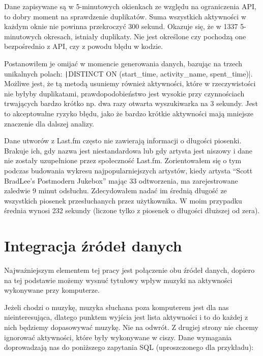 \documentclass[openright]{xmgr}
\begin{document}
        Dane zapisywane są w 5-minutowych okienkach ze względu na ograniczenia API, to dobry moment na sprawdzenie duplikatów.
        Suma wszystkich aktywności w każdym oknie nie powinna przekroczyć 300 sekund.
        Okazuje się, że w 1337 5-minutowych okresach, istniały duplikaty.
        Nie jest określone czy pochodzą one bezpośrednio z API, czy z powodu błędu w kodzie.

        Postanowiłem je omijać w momencie generowania danych, bazując na trzech unikalnych polach:
        \texttt|DISTINCT ON (start_time, activity_name, spent_time)|.
        Możliwe jest, że tą metodą usuniemy również aktywności, które w rzeczywistości nie byłyby duplikatami,
        prawdopodobieństwo jest wysokie przy czynnościach trwających bardzo krótko np. dwa razy otwarta wyszukiwarka na 3 sekundy.
        Jest to akceptowalne ryzyko błędu, jako że bardzo krótkie aktywności mają mniejsze znaczenie dla dalszej analizy.

        Dane utworów z Last.fm często nie zawierają informacji o długości piosenki.
        Brakuje ich, gdy nazwa jest niestandardowa lub gdy artysta jest niszowy i dane nie zostały uzupełnione przez społeczność Last.fm.
        Zorientowałem się o tym podczas budowania wykresu najpopularniejszych artystów,
        kiedy artysta ``Scott BradLee's Postmodern Jukebox'' mając 33 odtworzenia, ma zarejestrowane zaledwie 9 minut odsłuchu.
        Zdecydowałem nadać im średnią długość ze wszystkich piosenek przesłuchanych przez użytkownika.
        W moim przypadku średnia wynosi 232 sekundy (liczone tylko z piosenek o długości dłuższej od zera).

    \section{Integracja źródeł danych}

        Najważniejszym elementem tej pracy jest połączenie obu źródeł danych,
        dopiero na tej podstawie możemy wysnuć tytułowy wpływ muzyki na aktywności wykonywane przy komputerze.

        Jeżeli chodzi o muzykę, muzyka słuchana poza komputerem jest dla nas nieinteresująca,
        dlatego punktem wyjścia jest lista aktywności i to do każdej z nich będziemy dopasowywać muzykę. Nie na odwrót.
        Z drugiej strony nie chcemy ignorować aktywności, które były wykonywane w ciszy.
        Dane wymagania doprowadzają nas do poniższego zapytania SQL (uproszczonego dla przykładu):
\end{document}
